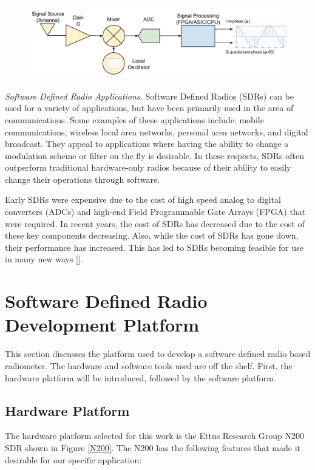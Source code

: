 {\begin{figure}[h!tb] 
\centering
\includegraphics[width=\textwidth]{Images/SDR_Prac_block.pdf}
\label{prac_sdr}
\end{figure}
}

\emph{Software Defined Radio Applications.}  Software Defined Radios (SDRs) can be used for a variety of applications, but have been primarily used in the area of communications.  Some examples of these applications include:  mobile communications, wireless local area networks, personal area networks, and digital broadcast.  They appeal to applications where having the ability to change a modulation scheme or filter on the fly is desirable.  In these respects, SDRs often outperform traditional hardware-only radios because of their ability to easily change their operations through software.  

Early SDRs were expensive due to the cost of high speed analog to digital converters (ADCs) and high-end Field Programmable Gate Arrays (FPGA) that were required.  In recent years, the cost of SDRs has decreased due to the cost of these key components decreasing.  Also, while the cost of SDRs has gone down, their performance has increased.  This has led to SDRs becoming feasible for use in many new ways [\cite{jondral2005software}].

\section{Software Defined Radio Development Platform} \label{SDR_platform}
This section discusses the platform used to develop a software defined radio based radiometer.  The hardware and software tools used are off the shelf.  First, the hardware platform will be introduced, followed by the software platform.  

\subsection{Hardware Platform}\label{N200_HW}
The hardware platform selected for this work is the Ettus Research Group N200 SDR shown in Figure \ref{N200}.  The N200 has the following features that made it desirable for our specific application:

